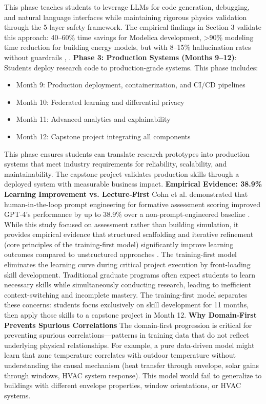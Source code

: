 \documentclass[12pt,a4paper]{article}
\begin{document}
This phase teaches students to leverage LLMs for code generation, debugging, and natural language interfaces while maintaining rigorous physics validation through the 5-layer safety framework. The empirical findings in Section 3 validate this approach: 40--60\% time savings for Modelica development, >90\% modeling time reduction for building energy models, but with 8--15\% hallucination rates without guardrails \cite{ref61}, \cite{ref21}.
\textbf{Phase 3: Production Systems (Months 9--12)}: Students deploy research code to production-grade systems. This phase includes:
\begin{itemize}
  \item Month 9: Production deployment, containerization, and CI/CD pipelines
  \item Month 10: Federated learning and differential privacy
  \item Month 11: Advanced analytics and explainability
  \item Month 12: Capstone project integrating all components
\end{itemize}
This phase ensures students can translate research prototypes into production systems that meet industry requirements for reliability, scalability, and maintainability. The capstone project validates production skills through a deployed system with measurable business impact.
\textbf{Empirical Evidence: 38.9\% Learning Improvement vs. Lecture-First}
Cohn et al. demonstrated that human-in-the-loop prompt engineering for formative assessment scoring improved GPT-4's performance by up to 38.9\% over a non-prompt-engineered baseline \cite{ref4}. While this study focused on assessment rather than building simulation, it provides empirical evidence that structured scaffolding and iterative refinement (core principles of the training-first model) significantly improve learning outcomes compared to unstructured approaches \cite{ref4}. The training-first model eliminates the learning curve during critical project execution by front-loading skill development. Traditional graduate programs often expect students to learn necessary skills while simultaneously conducting research, leading to inefficient context-switching and incomplete mastery. The training-first model separates these concerns: students focus exclusively on skill development for 11 months, then apply those skills to a capstone project in Month 12.
\textbf{Why Domain-First Prevents Spurious Correlations}
The domain-first progression is critical for preventing spurious correlations---patterns in training data that do not reflect underlying physical relationships. For example, a pure data-driven model might learn that zone temperature correlates with outdoor temperature without understanding the causal mechanism (heat transfer through envelope, solar gains through windows, HVAC system response). This model would fail to generalize to buildings with different envelope properties, window orientations, or HVAC systems.
\end{document}
